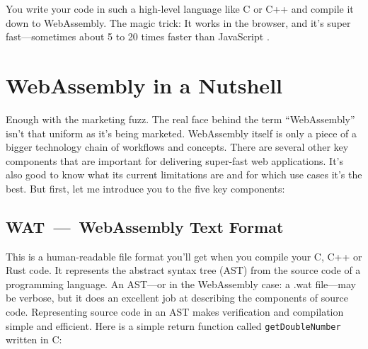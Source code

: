 \documentclass[10pt]{article}
\begin{document}
\begin{sloppypar}
  \begin{figure}[ht]
    \centering
    \label{fig:wasm}
  \end{figure}

  You write your code in such a high-level language like C or C++ and compile it down to WebAssembly. The magic trick: It works in the browser, and it’s super fast—sometimes about 5 to 20 times faster than JavaScript \citep{aboukhalil_how_2019}.

  \section{WebAssembly in a Nutshell}
  \label{sec:wasm-in-a-nutshell}

  Enough with the marketing fuzz. The real face behind the term “WebAssembly” isn’t that uniform as it’s being marketed. WebAssembly itself is only a piece of a bigger technology chain of workflows and concepts. There are several other key components that are important for delivering super-fast web applications. It’s also good to know what its current limitations are and for which use cases it’s the best. But first, let me introduce you to the five key components:

  \subsection{WAT~—~WebAssembly Text Format}
  \label{sec:webassembly-text-format}

  This is a human-readable file format you’ll get when you compile your C, C++ or Rust code. It represents the abstract syntax tree (AST) from the source code of a programming language. An AST—or in the WebAssembly case: a .wat file—may be verbose, but it does an excellent job at describing the components of source code. Representing source code in an AST makes verification and compilation simple and efficient. Here is a simple return function called \lstinline{getDoubleNumber} written in C:


\end{sloppypar}
\end{document}
